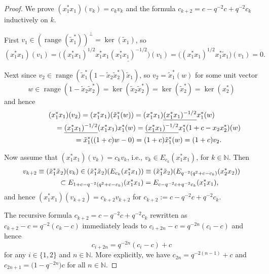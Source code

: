 \documentclass[pdftex]{sigma}
\begin{document}
\begin{proof} We prove $( x_{1}^{\ast}x_{1}) ( v_{k})=c_{k}v_{k}$ and the formula $c_{k+2}=c-q^{-2}c+q^{-2}c_{k}$ inductively on
$k$.

First $v_{1}\in( \operatorname{range}( \tilde{x}_{1}^{\ast
}) ) ^{\perp}=\ker( \tilde{x}_{1}) $, so
\[
( x_{1}^{\ast}x_{1}) ( v_{1}) =\big( (
x_{1}^{\ast}x_{1}) ^{1/2}x_{1}^{\ast}x_{1}\underline{(
x_{1}^{\ast}x_{1}) ^{-1/2}}\big) ( v_{1}) =\big(
( x_{1}^{\ast}x_{1}) ^{1/2}x_{1}^{\ast}\tilde{x}_{1}\big)( v_{1}) =0.
\]

Next since $v_{2}\in\operatorname{range}( \tilde{x}_{1}^{\ast}(1-\tilde{x}_{2}\tilde{x}_{2}^{\ast}) \tilde{x}_{1}) $, so
$v_{2}=\tilde{x}_{1}^{\ast}(w) $ for some unit vector
\[
w\in\operatorname{range}( 1-\tilde{x}_{2}\tilde{x}_{2}^{\ast})
=\ker( \tilde{x}_{2}\tilde{x}_{2}^{\ast}) =\ker( \tilde
{x}_{2}^{\ast}) =\ker( x_{2}^{\ast})
\]
and hence
\begin{gather*}
( x_{1}^{\ast}x_{1}) ( v_{2}) =( x_{1}^{\ast
}x_{1}) ( \tilde{x}_{1}^{\ast}(w) ) =(
x_{1}^{\ast}x_{1}) \underline{( x_{1}^{\ast}x_{1})
^{-1/2}}x_{1}^{\ast}(w)
\\
\hphantom{( x_{1}^{\ast}x_{1}) ( v_{2})}{}
=\underline{( x_{1}^{\ast}x_{1}) ^{-1/2}}( x_{1}^{\ast
}x_{1}) x_{1}^{\ast}(w) =\underline{( x_{1}^{\ast
}x_{1}) ^{-1/2}}x_{1}^{\ast}( 1+c-x_{2}x_{2}^{\ast})
(w)\\
\hphantom{( x_{1}^{\ast}x_{1}) ( v_{2})}{}
=\tilde{x}_{1}^{\ast}( ( 1+c) w-0) =(
1+c) \tilde{x}_{1}^{\ast}(w) =( 1+c) v_{2}.
\end{gather*}

Now assume that $( x_{1}^{\ast}x_{1}) ( v_{k})
=c_{k}v_{k}$, i.e., $v_{k}\in E_{c_{k}}( x_{1}^{\ast}x_{1}) $, for
$k\in\mathbb{N}$. Then
\begin{gather*}
v_{k+2}\equiv( \tilde{x}_{1}^{\ast}\tilde{x}_{2}) (
v_{k}) \in( \tilde{x}_{1}^{\ast}\tilde{x}_{2}) (
E_{c_{k}}( x_{1}^{\ast}x_{1}) ) \equiv( \tilde
{x}_{1}^{\ast}\tilde{x}_{2}) ( E_{q^{-2}( q^{2}+c-c_{k}) }( x_{2}^{\ast}x_{2}) )
\\
\hphantom{v_{k+2}}{}
\subset E_{1+c-q^{-2}( q^{2}+c-c_{k}) }( x_{1}^{\ast}%
x_{1}) =E_{c-q^{-2}c+q^{-2}c_{k}}( x_{1}^{\ast}x_{1}) ,
\end{gather*}
and hence $( x_{1}^{\ast}x_{1}) ( v_{k+2})
=c_{k+2}v_{k+2}$ for $c_{k+2}:=c-q^{-2}c+q^{-2}c_{k}$.

The recursive formula $c_{k+2}=c-q^{-2}c+q^{-2}c_{k}$ rewritten as
$c_{k+2}-c=q^{-2}( c_{k}-c) $ immediately leads to $c_{i+2n}
-c=q^{-2n}( c_{i}-c) $ and hence
\[
c_{i+2n}=q^{-2n}( c_{i}-c) +c
\]
for any $i\in\{ 1,2\} $ and $n\in\mathbb{N}$. More explicitly, we
have $c_{2n}=q^{-2( n-1) }+c$ and $c_{2n+1}=\big(1-q^{-2n}\big) c$ for all $n\in\mathbb{N}$.
\end{proof}
\end{document}
